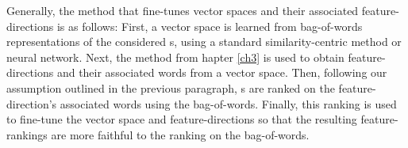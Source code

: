 Generally, the method that fine-tunes vector spaces and their associated feature-directions is as follows: First, a vector space is learned from bag-of-words representations of the considered s, using a standard similarity-centric method or neural network. Next, the method from hapter \ref{ch3} is used to  obtain feature-directions and their associated words from a vector space. Then, following our assumption outlined in the previous paragraph,  s are ranked on the feature-direction's associated words using the bag-of-words. Finally, this ranking is used to fine-tune the vector space and feature-directions so that the resulting feature-rankings are more faithful to the ranking on the bag-of-words.









